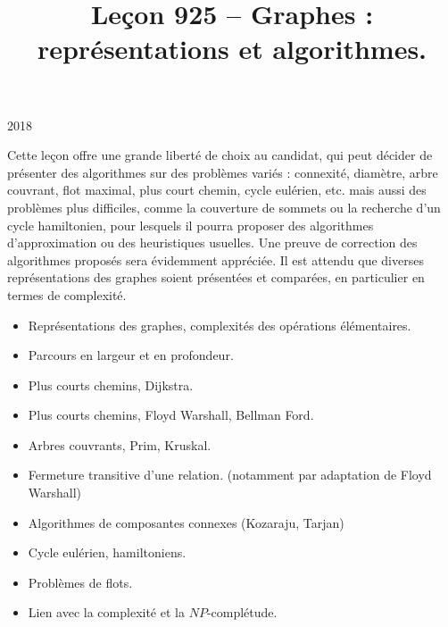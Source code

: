 \documentclass{agregfiche}
\title{Leçon 925 -- Graphes : représentations et algorithmes.}
\begin{document}
\maketitle

\secrapports

\begin{rapport}{2018}

Cette leçon offre une grande liberté de choix au candidat, qui peut décider de présenter des algorithmes sur des problèmes variés : connexité, diamètre, arbre couvrant, flot maximal, plus court chemin, cycle eulérien, etc. mais aussi des problèmes plus difficiles, comme la couverture de sommets ou la recherche d’un cycle hamiltonien, pour lesquels il pourra proposer des algorithmes d’approximation ou des heuristiques usuelles. Une preuve de correction des algorithmes proposés sera évidemment appréciée. Il est attendu que diverses représentations des graphes soient présentées et comparées, en particulier en termes de complexité.

\end{rapport}

\secindispensables

\begin{itemize}
    \item Représentations des graphes, complexités des opérations élémentaires.
    \item Parcours en largeur et en profondeur.
    \item Plus courts chemins, Dijkstra.
\end{itemize}

\secasavoir
\begin{itemize}
    \item Plus courts chemins, Floyd Warshall, Bellman Ford.
    \item Arbres couvrants, Prim, Kruskal.
    \item Fermeture transitive d'une relation. (notamment par adaptation de Floyd Warshall)
    \end{itemize}
\secidees

\begin{itemize}
    \item Algorithmes de composantes connexes (Kozaraju, Tarjan)
    \item Cycle eulérien, hamiltoniens.
    \item Problèmes de flots.
    \item Lien avec la complexité et la $NP$-complétude.
\end{itemize}
\end{document}
